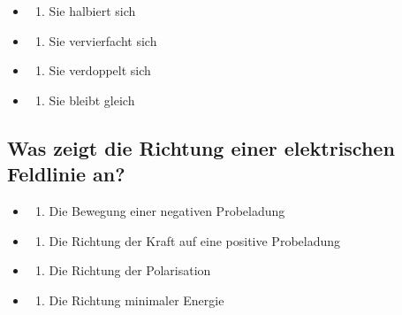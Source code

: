 \documentclass[
  11pt,
]{article}
\providecommand{\tightlist}{%
  \setlength{\itemsep}{0pt}\setlength{\parskip}{0pt}}
\begin{document}
\begin{itemize}
\tightlist
\item
  \begin{enumerate}
  \def\labelenumi{\Alph{enumi})}
  \tightlist
  \item
    Sie halbiert sich\\
  \end{enumerate}
\item
  \begin{enumerate}
  \def\labelenumi{\Alph{enumi})}
  \setcounter{enumi}{1}
  \tightlist
  \item
    Sie vervierfacht sich\\
  \end{enumerate}
\item
  \begin{enumerate}
  \def\labelenumi{\Alph{enumi})}
  \setcounter{enumi}{2}
  \tightlist
  \item
    Sie verdoppelt sich\\
  \end{enumerate}
\item
  \begin{enumerate}
  \def\labelenumi{\Alph{enumi})}
  \setcounter{enumi}{3}
  \tightlist
  \item
    Sie bleibt gleich
  \end{enumerate}
\end{itemize}

\subsection{Was zeigt die Richtung einer elektrischen Feldlinie
an?}\label{was-zeigt-die-richtung-einer-elektrischen-feldlinie-an}

\begin{itemize}
\tightlist
\item
  \begin{enumerate}
  \def\labelenumi{\Alph{enumi})}
  \tightlist
  \item
    Die Bewegung einer negativen Probeladung\\
  \end{enumerate}
\item
  \begin{enumerate}
  \def\labelenumi{\Alph{enumi})}
  \setcounter{enumi}{1}
  \tightlist
  \item
    Die Richtung der Kraft auf eine positive Probeladung\\
  \end{enumerate}
\item
  \begin{enumerate}
  \def\labelenumi{\Alph{enumi})}
  \setcounter{enumi}{2}
  \tightlist
  \item
    Die Richtung der Polarisation\\
  \end{enumerate}
\item
  \begin{enumerate}
  \def\labelenumi{\Alph{enumi})}
  \setcounter{enumi}{3}
  \tightlist
  \item
    Die Richtung minimaler Energie
  \end{enumerate}
\end{itemize}
\end{document}
